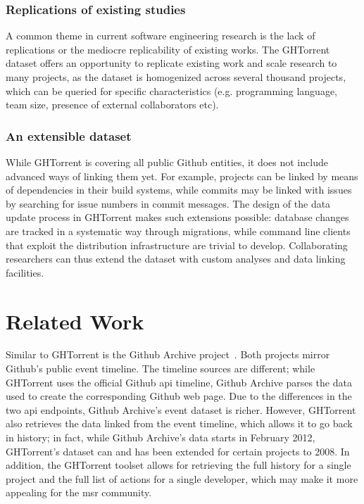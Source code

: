 \documentclass[conference]{IEEEtran}
\begin{document}
\subsubsection{Replications of existing studies} A common theme in current
software engineering research is the lack of replications or the
mediocre replicability of existing works. The GHTorrent dataset offers
an opportunity to replicate existing work and scale research to many
projects, as the dataset is homogenized across several thousand projects,
which can be queried for specific characteristics (e.g. programming language,
team size, presence of external collaborators etc).

\subsubsection{An extensible dataset} While GHTorrent is covering all 
 public Github entities, it does not include advanced ways of
linking them yet. For example, projects can be linked by means of dependencies
in their build systems, while commits may be linked with issues by
searching for issue numbers in commit messages. The design of the
data update process in GHTorrent makes such extensions possible:
database changes are tracked in a systematic way through migrations, while  
command line clients that exploit the distribution infrastructure are
trivial to develop. Collaborating researchers can thus extend the dataset
with custom analyses and data linking facilities.


\section{Related Work}

Similar to GHTorrent is the Github Archive project~\cite{Grigo13}.  Both
projects mirror Github's public event timeline. The timeline sources are
different; while GHTorrent uses the official Github {\sc api} timeline, Github
Archive parses the data used to create the corresponding Github web page.  Due
to the differences in the two {\sc api} endpoints, Github Archive's event
dataset is richer.  However, GHTorrent also retrieves the data linked from the
event timeline, which allows it to go back in history; in fact, while Github
Archive's data starts in February 2012, GHTorrent's dataset can and has been
extended for certain projects to 2008.  In addition, the GHTorrent toolset
allows for retrieving the full history for a single project and the full list of
actions for a single developer, which may make it more appealing for the {\sc
msr} community.
\end{document}
